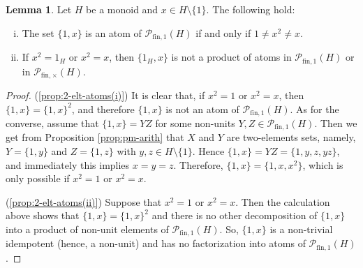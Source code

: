 \documentclass{report}
\renewcommand{\P}{\mathcal{P}}
\newcommand{\fin}{\textrm{fin}}
\newcommand{\funt}{{\textrm{fin}, \times}}
\newcommand{\fun}{{\textrm{fin}, 1}}
\renewcommand{\:}{\text{:}}
\theoremstyle{definition}
\newtheorem{lemma}[defn]{Lemma}
\begin{document}
%
%
\begin{lemma}\label{lem:2-elt-atoms}
Let $H$ be a monoid and $x \in H \setminus \{1\}$.
The following hold:
\begin{enumerate}[(i)]
%
\item\label{prop:2-elt-atoms(i)} The set $\{1, x\}$ is an atom of $\P_\fun(H)$ if and only if $1 \ne x^2 \ne x$.
\item\label{prop:2-elt-atoms(ii)} If $x^2=1_H$ or $x^2=x$, then $\{1_H,x\}$ is not a product of atoms in $\P_{\fin,1}(H)$ or in $\P_\funt(H)$.
\end{enumerate}
\end{lemma}
%
\begin{proof}
(\ref{prop:2-elt-atoms(i)}) It is clear that, if $x^2 = 1$ or $x^2 = x$, then $\{1,x\} = \{1,x\}^2$, and therefore $\{1,x\}$ is not an atom of $\mathcal P_\fun(H)$. As for the converse, assume that $\{1,x\} = YZ$ for some non-units $Y,Z \in \mathcal P_\fun(H)$. Then we get from Proposition \ref{prop:pm-arith} that $X$ and $Y$ are two-elements sets, namely, $Y = \{1, y\}$ and $Z = \{1, z\}$ with $y,z \in H \setminus \{1\}$. Hence $\{1,x\} = YZ = \{1,y,z,yz\}$, and immediately this implies $x=y=z$.  Therefore, $\{1,x\} = \{1,x,x^2\}$, which is only possible if $x^2 = 1$ or $x^2 = x$.

(\ref{prop:2-elt-atoms(ii)}) Suppose that $x^2 = 1$ or $x^2 = x$. Then the calculation above shows that $\{1,x\} = \{1,x\}^2$ and there is no other decomposition of $\{1,x\}$ into a product of non-unit elements of $\mathcal P_{\fin,1}(H)$. So, $\{1,x\}$ is a non-trivial idempotent (hence, a non-unit) and has no factorization into atoms of $\mathcal P_{\fin,1}(H)$.


\end{proof}
\end{document}
